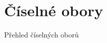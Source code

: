 \clearpage

\section{Číselné obory}
\label{sec:zaklady-ciselne-obory}

\begin{table}[!ht]
    \centering
    
    \caption{Přehled číselných oborů}
    \label{tab:table}
\end{table}
